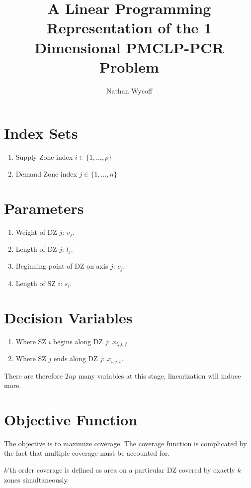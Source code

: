 \documentclass[a4paper]{article}
\title{A Linear Programming Representation of the 1 Dimensional PMCLP-PCR Problem}
\author{Nathan Wycoff}
\begin{document}
\maketitle

\section{Index Sets}

\begin{enumerate}
    \item Supply Zone index $i \in \{1, \ldots, p\}$
    \item Demand Zone index $j \in \{1, \ldots, n\}$
\end{enumerate}

\section{Parameters}

\begin{enumerate}
    \item Weight of DZ $j$: $v_j$.
    \item Length of DZ $j$: $l_j$.
    \item Beginning point of DZ on axis $j$: $c_{j}$.
    \item Length of SZ $i$: $s_i$.
\end{enumerate}

\section{Decision Variables}

\begin{enumerate}
    \item Where SZ $i$ begins along DZ $j$: $x_{i,j,f}$.
    \item Where SZ $j$ ends along DZ $j$: $x_{i,j,t}$.
\end{enumerate}

There are therefore $2np$ many variables at this stage, linearization will induce more.

\section{Objective Function}

The objective is to maximize coverage. The coverage function is complicated by the fact that multiple coverage must be accounted for. 

$k$'th order coverage is defined as area on a particular DZ covered by exactly $k$ zones simultaneously. 
\end{document}

